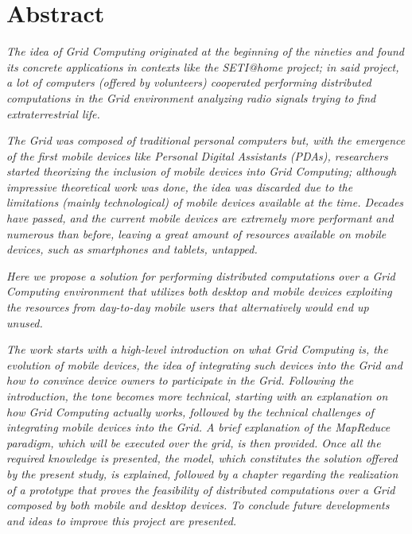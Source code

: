 \chapter*{Abstract}
\begin{spacing}{1.3}
\textit{\small
The idea of Grid Computing originated at the beginning of the nineties and found its concrete applications in contexts like the SETI@home project; in said project, a lot of computers (offered by volunteers) cooperated performing distributed computations in the Grid environment analyzing radio signals trying to find extraterrestrial life.
}\newline

\textit{\small
The Grid was composed of traditional personal computers but, with the emergence of the first mobile devices like Personal Digital Assistants (PDAs), researchers started theorizing the inclusion of mobile devices into Grid Computing; although impressive theoretical work was done, the idea was discarded due to the limitations (mainly technological) of mobile devices available at the time. Decades have passed, and the current mobile devices are extremely more performant and numerous than before, leaving a great amount of resources available on mobile devices, such as smartphones and tablets, untapped.
}\newline

\textit{\small
Here we propose a solution for performing distributed computations over a Grid Computing environment that utilizes both desktop and mobile devices exploiting the resources from day-to-day mobile users that alternatively would end up unused.
}\newline

\textit{\small
The work starts with a high-level introduction on what Grid Computing is, the evolution of mobile devices, the idea of integrating such devices into the Grid and how to convince device owners to participate in the Grid. Following the introduction, the tone becomes more technical, starting with an explanation on how Grid Computing actually works, followed by the technical challenges of integrating mobile devices into the Grid. A brief explanation of the MapReduce paradigm, which will be executed over the grid, is then provided. Once all the required knowledge is presented, the model, which constitutes the solution offered by the present study, is explained, followed by a chapter regarding the realization of a prototype that proves the feasibility of distributed computations over a Grid composed by both mobile and desktop devices. To conclude future developments and ideas to improve this project are presented.
}
\end{spacing}
